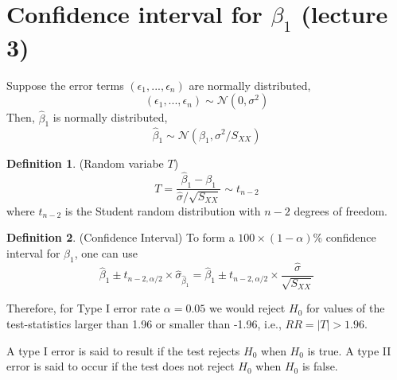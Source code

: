 \documentclass[12pt]{article}
\theoremstyle{definition}
\newtheorem{definition}{Definition}[section]
\theoremstyle{remark}
\begin{document}
\section{Confidence interval for $\beta_1$ (lecture 3)}
    \begin{proposition}
        Suppose the error terms $(\epsilon_1,..., \epsilon_n)$ are normally distributed,
        \begin{equation}
            (\epsilon_1,..., \epsilon_n)\sim \mathcal{N}(0,\sigma^2)
        \end{equation}
        Then, $\hat{\beta}_1$ is normally distributed,
        \begin{equation}
            \hat{\beta}_1 \sim \mathcal{N}(\beta_1,\sigma^2/S_{XX} )
        \end{equation}
    \end{proposition}
    \begin{definition}(Random variabe $T$)
        \begin{equation}
            T = \frac{\hat{\beta}_1-\beta_1}{\hat{\sigma} / \sqrt{S_{XX}}} \sim t_{n-2}
        \end{equation}
        where $t_{n-2}$ is the Student random distribution with $n-2$ degrees of freedom.
    \end{definition}
    \begin{definition}(Confidence Interval)
        To form a $100 \times (1 - \alpha) \%$ confidence interval for $\beta_1$, one can use
        \begin{equation}
            \hat{\beta}_1 \pm t_{n-2, \alpha/2}\times \hat{\sigma}_{\hat{\beta}_1} = \hat{\beta}_1 \pm t_{n-2, \alpha/2}\times \frac{\hat{\sigma}}{\sqrt{S_{XX}}}
        \end{equation}
    \end{definition}
    \begin{example}
        Therefore, for Type I error rate $\alpha = 0.05$ we would reject $H_0$ for values of the test-statistics larger than
        1.96 or smaller than -1.96, i.e., $RR = {|T| > 1.96}.$    
    \end{example}
    \begin{note}
        A type I error is said to result if the test rejects $H_0$ when $H_0$ is true.
        A type II error is said to occur if the test does not reject $H_0$ when $H_0$ is false.
    \end{note}
\end{document}
